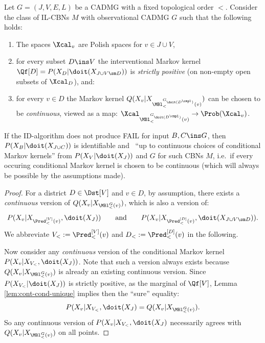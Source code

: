 \begin{Thm}
    \label{thm:ID-soundness-cont}
    Let $G=(J,V,E,L)$ be a CADMG with a fixed topological order $<$. %
    Consider the class of IL-CBNs $M$ with observational CADMG $G$ such that the following holds: 
    \begin{enumerate}
        \item The spaces $\Xcal_v$ are Polish spaces for $v \in J \cup V$,
        \item for every subset $D \ins V$ the interventional Markov kernel $\Qf[D]=P(X_D|\doit(X_{J \cup V \sm D}))$ 
            is \emph{strictly positive} (on non-empty open subsets of $\Xcal_{D}$), and:
        \item for every $v \in D$ the Markov kernel $Q(X_v|X_{\MBl^{G_{\doit(D^\cmpl)}}_<(v)})$ 
            can be chosen to be \emph{continuous}, viewed as a map: $\Xcal_{\MBl^{G_{\doit(D^\cmpl)}}_<(v)} \to \Prob(\Xcal_v)$.
    \end{enumerate}
    If the ID-algorithm does not produce FAIL for input $B, C \ins G$,
    then $P(X_B|\doit(X_{J \cup C}))$ is identifiable
    and \trackable\ ``up to continuous choices of conditional Markov kernels'' 
    from $P(X_V|\doit(X_J))$ and $G$ for such CBNs $M$, 
    i.e.\ if every occuring conditional Markov kernel is chosen to be continuous (which will always be possible by the assumptions made).
    \begin{proof}
        For a district $D \in \Dst[V]$ and $v \in D$, 
        by assumption, there exists a \emph{continuous} version of $Q(X_v|X_{\MBl^G_<(v)})$, which is also a version of:
     \[ P(X_v|X_{\Pred^{[V]}_<(v)},\doit(X_J)) \qquad \text{and} \qquad P(X_v|X_{\Pred^{[D]}_<(v)},\doit(X_{J \cup V\sm D})).\]
      We abbreviate $V_<:=\Pred^{[V]}_<(v)$ and $D_<:=\Pred^{[D]}_<(v)$ in the following.

     Now consider any \emph{continuous} version of the conditional Markov kernel $P(X_v|X_{V_<},\doit(X_J))$.
     Note that such a version always exists because $Q(X_v|X_{\MBl^G_<(v)})$ is already an existing continuous version.
     Since $P(X_{V_<}|\doit(X_J))$ is strictly positive, as the marginal of $\Qf[V]$,
      Lemma \ref{lem:cont-cond-unique} implies then the ``sure'' equality:
     \[ P(X_v|X_{V_<},\doit(X_J)=Q(X_v|X_{\MBl^G_<(v)}).  \]
     So any continuous version of $P(X_v|X_{V_<},\doit(X_J)$ necessarily agrees with $Q(X_v|X_{\MBl^G_<(v)})$ on all points.


\end{proof}
\end{Thm}
